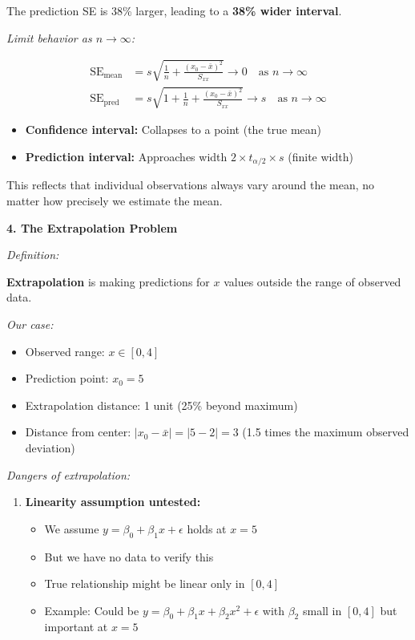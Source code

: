\documentclass[12pt]{article}
\begin{document}
\begin{explanation}
The prediction SE is 38\% larger, leading to a \textbf{38\% wider interval}.

\textit{Limit behavior as $n \to \infty$:}

\begin{align*}
\text{SE}_{\text{mean}} &= s\sqrt{\frac{1}{n} + \frac{(x_0-\bar{x})^2}{S_{xx}}} \to 0 \quad \text{as } n \to \infty \\
\text{SE}_{\text{pred}} &= s\sqrt{1 + \frac{1}{n} + \frac{(x_0-\bar{x})^2}{S_{xx}}} \to s \quad \text{as } n \to \infty
\end{align*}

\begin{itemize}
    \item \textbf{Confidence interval:} Collapses to a point (the true mean)
    \item \textbf{Prediction interval:} Approaches width $2 \times t_{\alpha/2} \times s$ (finite width)
\end{itemize}

This reflects that individual observations always vary around the mean, no matter how precisely we estimate the mean.

\textbf{4. The Extrapolation Problem}

\textit{Definition:}

\textbf{Extrapolation} is making predictions for $x$ values outside the range of observed data.

\textit{Our case:}

\begin{itemize}
    \item Observed range: $x \in [0, 4]$
    \item Prediction point: $x_0 = 5$
    \item Extrapolation distance: 1 unit (25\% beyond maximum)
    \item Distance from center: $|x_0 - \bar{x}| = |5 - 2| = 3$ (1.5 times the maximum observed deviation)
\end{itemize}

\textit{Dangers of extrapolation:}

\begin{enumerate}
    \item \textbf{Linearity assumption untested:}
    \begin{itemize}
        \item We assume $y = \beta_0 + \beta_1 x + \epsilon$ holds at $x = 5$
        \item But we have no data to verify this
        \item True relationship might be linear only in $[0, 4]$
        \item Example: Could be $y = \beta_0 + \beta_1 x + \beta_2 x^2 + \epsilon$ with $\beta_2$ small in $[0,4]$ but important at $x=5$
    \end{itemize}


\end{enumerate}
\end{explanation}
\end{document}
